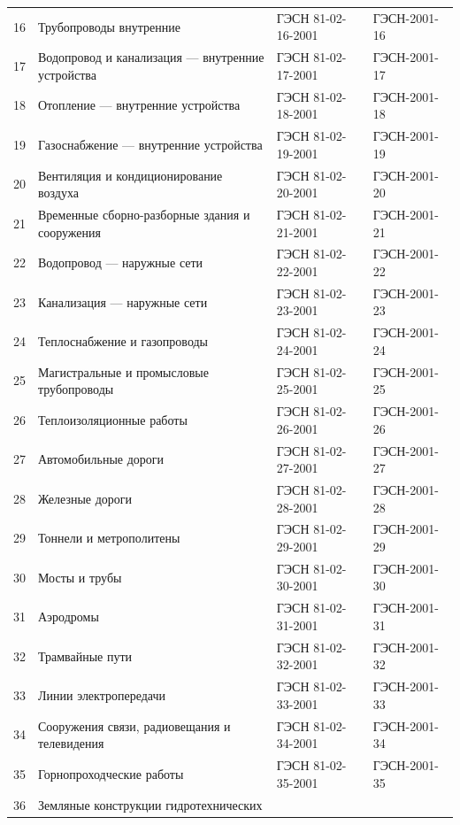 \documentclass[a4paper,12pt]{article}
\begin{document}
\begin{longtable}[!hbp]{l p{5cm} p{5cm} p{3cm}}
        16 	& Трубопроводы внутренние					& ГЭСН 81-02-16-2001 	& ГЭСН-2001-16\\ 
        17 	& Водопровод и канализация --- 
        внутренние устройства					& ГЭСН 81-02-17-2001 	& ГЭСН-2001-17\\ 
        18 	& Отопление --- внутренние устройства		& ГЭСН 81-02-18-2001 	& ГЭСН-2001-18\\ 
        19 	& Газоснабжение --- внутренние устройства	& ГЭСН 81-02-19-2001 	& ГЭСН-2001-19\\ 
        20 	& Вентиляция и кондиционирование воздуха	& ГЭСН 81-02-20-2001 	& ГЭСН-2001-20\\
        21 	& Временные сборно-разборные здания 
        и сооружения							& ГЭСН 81-02-21-2001 	& ГЭСН-2001-21\\ 
        22 	& Водопровод --- наружные сети				& ГЭСН 81-02-22-2001 	& ГЭСН-2001-22\\ 
        23 	& Канализация --- наружные сети				& ГЭСН 81-02-23-2001 	& ГЭСН-2001-23\\ 
        24 	& Теплоснабжение и газопроводы				& ГЭСН 81-02-24-2001 	& ГЭСН-2001-24\\ 
        25 	& Магистральные и промысловые трубопроводы	& ГЭСН 81-02-25-2001 	& ГЭСН-2001-25\\ 
        26 	& Теплоизоляционные работы					& ГЭСН 81-02-26-2001 	& ГЭСН-2001-26\\ 
        27 	& Автомобильные дороги						& ГЭСН 81-02-27-2001 	& ГЭСН-2001-27\\ 
        28 	& Железные дороги							& ГЭСН 81-02-28-2001 	& ГЭСН-2001-28\\ 
        29 	& Тоннели и метрополитены					& ГЭСН 81-02-29-2001 	& ГЭСН-2001-29\\ 
        30 	& Мосты и трубы								& ГЭСН 81-02-30-2001 	& ГЭСН-2001-30\\ 
        31 	& Аэродромы									& ГЭСН 81-02-31-2001 	& ГЭСН-2001-31\\ 
        32 	& Трамвайные пути							& ГЭСН 81-02-32-2001 	& ГЭСН-2001-32\\ 
        33 	& Линии электропередачи						& ГЭСН 81-02-33-2001 	& ГЭСН-2001-33\\ 
        34 	& Сооружения связи, радиовещания 
        и телевидения							& ГЭСН 81-02-34-2001 	& ГЭСН-2001-34\\ 
        35 	& Горнопроходческие работы					& ГЭСН 81-02-35-2001 	& ГЭСН-2001-35\\ 
        36 	& Земляные конструкции гидротехнических 

\end{longtable}
\end{document}
